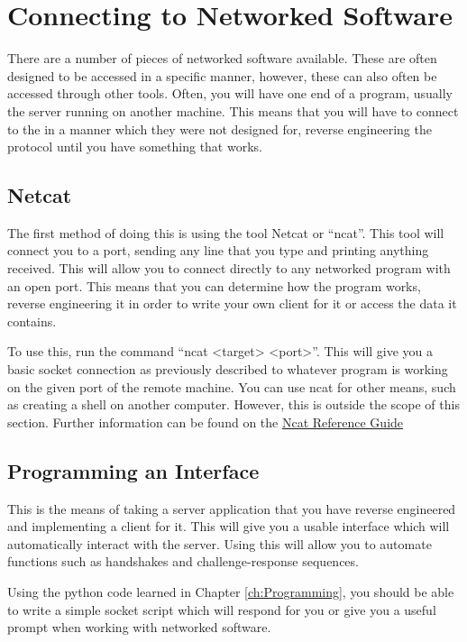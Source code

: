 	\section{Connecting to Networked Software}
		There are a number of pieces of networked software available.
		These are often designed to be accessed in a specific manner, however, these can also often be accessed through other tools.
		Often, you will have one end of a program, usually the server running on another machine.
		This means that you will have to connect to the in a manner which they were not designed for,
		reverse engineering the protocol until you have something that works.

		\subsection{Netcat}
			The first method of doing this is using the tool Netcat or ``ncat''.
			This tool will connect you to a port, sending any line that you type and printing anything received.
			This will allow you to connect directly to any networked program with an open port.
			This means that you can determine how the program works, reverse engineering it in order to write your own client for it or access the data it contains.

			To use this, run the command ``ncat <target> <port>''.
			This will give you a basic socket connection as previously described to whatever program is working on the given port of the remote machine.
			You can use ncat for other means, such as creating a shell on another computer.
			However, this is outside the scope of this section.
			Further information can be found on the \href{https://nmap.org/book/ncat-man.html}{Ncat Reference Guide}

		\subsection{Programming an Interface}
			This is the means of taking a server application that you have reverse engineered and implementing a client for it.
			This will give you a usable interface which will automatically interact with the server.
			Using this will allow you to automate functions such as handshakes and challenge-response sequences.

			Using the python code learned in Chapter \ref{ch:Programming},
			you should be able to write a simple socket script which will respond for you or give you a useful prompt when working with networked software.

